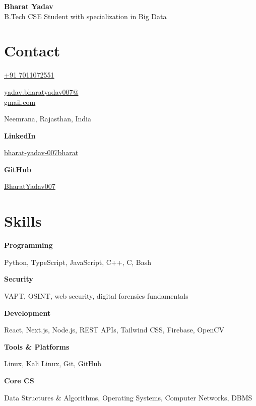 \documentclass[a4paper,10pt]{article}
\newcommand{\sidebarItem}[2]{%
    \textbf{#1}\par
    #2\par\vspace{7pt}
}
\newlength{\sidebarwidth}
\newlength{\bodyheight}
\begin{document}
\begin{center}
    {\fontsize{27}{31}\selectfont\bfseries Bharat Yadav}\\[5pt]
    {\fontsize{12.5}{15.5}\selectfont B.Tech CSE Student with specialization in Big Data}
\end{center}
\vspace{2pt}

\noindent\begin{minipage}[t]{\sidebarwidth}
\vspace{0pt}
\colorbox{sidebar}{%
\begin{minipage}[t][\bodyheight][s]{\dimexpr\sidebarwidth-2\fboxsep\relax}
\fontsize{11.5}{13.5}\selectfont\raggedright
\titlespacing*{\section}{0pt}{8pt}{5pt}
\vspace{0pt}
\section*{Contact}
\href{tel:+917011072551}{+91 7011072551}\par\vspace{6pt}
\href{mailto:yadav.bharatyadav007@gmail.com}{yadav.bharatyadav007@\\gmail.com}\par\vspace{6pt}
Neemrana, Rajasthan, India\par\vspace{6pt}
\textbf{LinkedIn}\par
\href{https://www.linkedin.com/in/bharat-yadav-007bharat/}{bharat-yadav-007bharat}\par\vspace{6pt}
\textbf{GitHub}\par
\href{https://github.com/BharatYadav007}{BharatYadav007}
\vfill

\section*{Skills}
\sidebarItem{Programming}{Python, TypeScript, JavaScript, C++, C, Bash}
\sidebarItem{Security}{VAPT, OSINT, web security, digital forensics fundamentals}
\sidebarItem{Development}{React, Next.js, Node.js, REST APIs, Tailwind CSS, Firebase, OpenCV}
\sidebarItem{Tools \& Platforms}{Linux, Kali Linux, Git, GitHub}
\textbf{Core CS}\par
Data Structures \& Algorithms, Operating Systems, Computer Networks, DBMS
\vfill


\end{minipage}}
\end{minipage}
\end{document}
